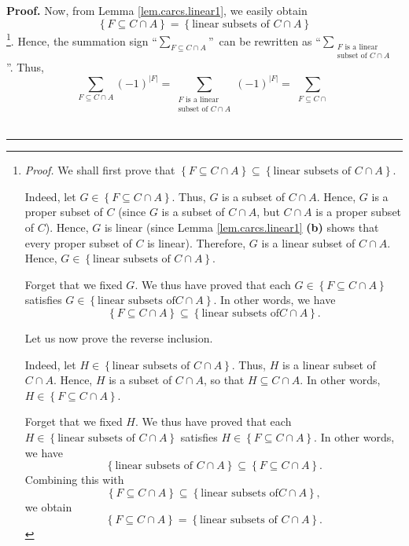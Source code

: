 \documentclass[numbers=enddot,12pt,final,onecolumn,notitlepage]{scrartcl}%
\numberwithin{exer}{section}
\theoremstyle{definition}
\newenvironment{proof}[1][Proof]{\noindent\textbf{#1.} }{\ \rule{0.5em}{0.5em}}
\let\sumnonlimits\sum
\renewcommand{\sum}{\sumnonlimits\limits}
\newenvironment{verlong}{}{}
\begin{document}
\begin{verlong}
\begin{proof}
Now, from Lemma \ref{lem.carcs.linear1}, we easily obtain%
\[
\left\{  F\subseteq C\cap A\right\}  =\left\{  \text{linear subsets of }C\cap
A\right\}
\]
\footnote{\textit{Proof.} We shall first prove that $\left\{  F\subseteq C\cap
A\right\}  \subseteq\left\{  \text{linear subsets of }C\cap A\right\}  $.
\par
Indeed, let $G\in\left\{  F\subseteq C\cap A\right\}  $. Thus, $G$ is a subset
of $C\cap A$. Hence, $G$ is a proper subset of $C$ (since $G$ is a subset of
$C\cap A$, but $C\cap A$ is a proper subset of $C$). Hence, $G$ is linear
(since Lemma \ref{lem.carcs.linear1} \textbf{(b)} shows that every proper
subset of $C$ is linear). Therefore, $G$ is a linear subset of $C\cap A$.
Hence, $G\in\left\{  \text{linear subsets of }C\cap A\right\}  $.
\par
Forget that we fixed $G$. We thus have proved that each $G\in\left\{
F\subseteq C\cap A\right\}  $ satisfies $G\in\left\{  \text{linear subsets of
}C\cap A\right\}  $. In other words, we have%
\[
\left\{  F\subseteq C\cap A\right\}  \subseteq\left\{  \text{linear subsets of
}C\cap A\right\}  .
\]
\par
Let us now prove the reverse inclusion.
\par
Indeed, let $H\in\left\{  \text{linear subsets of }C\cap A\right\}  $. Thus,
$H$ is a linear subset of $C\cap A$. Hence, $H$ is a subset of $C\cap A$, so
that $H\subseteq C\cap A$. In other words, $H\in\left\{  F\subseteq C\cap
A\right\}  $.
\par
Forget that we fixed $H$. We thus have proved that each $H\in\left\{
\text{linear subsets of }C\cap A\right\}  $ satisfies $H\in\left\{  F\subseteq
C\cap A\right\}  $. In other words, we have%
\[
\left\{  \text{linear subsets of }C\cap A\right\}  \subseteq\left\{
F\subseteq C\cap A\right\}  .
\]
Combining this with%
\[
\left\{  F\subseteq C\cap A\right\}  \subseteq\left\{  \text{linear subsets of
}C\cap A\right\}  ,
\]
we obtain
\[
\left\{  F\subseteq C\cap A\right\}  =\left\{  \text{linear subsets of }C\cap
A\right\}  .
\]
}. Hence, the summation sign \textquotedblleft$\sum_{F\subseteq C\cap A}%
$\textquotedblright\ can be rewritten as \textquotedblleft$\sum
_{\substack{F\text{ is a linear}\\\text{subset of }C\cap A}}$%
\textquotedblright. Thus,
\[
\sum_{F\subseteq C\cap A}\left(  -1\right)  ^{\left\vert F\right\vert }%
=\sum_{\substack{F\text{ is a linear}\\\text{subset of }C\cap A}}\left(
-1\right)  ^{\left\vert F\right\vert }=\sum_{\substack{F\subseteq C\cap
}}\]
\end{proof}
\end{verlong}
\end{document}
